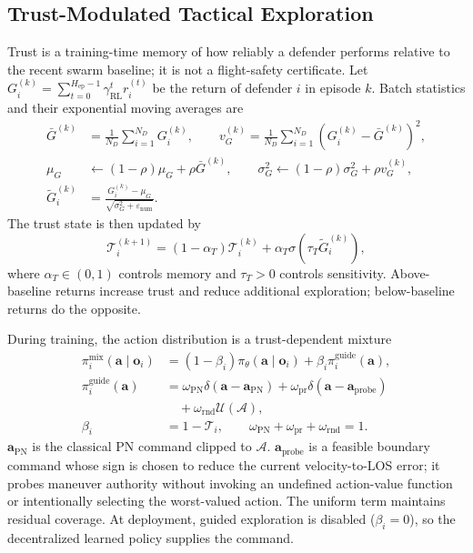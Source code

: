 \subsection{Trust-Modulated Tactical Exploration}
\label{subsec:trust_exploration}

Trust is a training-time memory of how reliably a defender performs relative to the recent
swarm baseline; it is not a flight-safety certificate. Let
$G_i^{(k)}=\sum_{t=0}^{H_{\mathrm{ep}}-1}\gamma_{\mathrm{RL}}^t r_i^{(t)}$ be the return
of defender $i$ in episode $k$. Batch statistics and their exponential moving averages are
\begin{equation}
\label{eq:trust_statistics}
\begin{aligned}
\bar G^{(k)}&=\frac{1}{N_D}\sum_{i=1}^{N_D}G_i^{(k)},\qquad
v_G^{(k)}=\frac{1}{N_D}\sum_{i=1}^{N_D}(G_i^{(k)}-\bar G^{(k)})^2,\\
\mu_G&\leftarrow(1-\rho)\mu_G+\rho\bar G^{(k)},\qquad
\sigma_G^2\leftarrow(1-\rho)\sigma_G^2+\rho v_G^{(k)},\\
\widetilde G_i^{(k)}&=\frac{G_i^{(k)}-\mu_G}
{\sqrt{\sigma_G^2+\varepsilon_{\mathrm{num}}}}.
\end{aligned}
\end{equation}
The trust state is then updated by
\begin{equation}
\label{eq:trust_update}
\mathcal T_i^{(k+1)}=(1-\alpha_T)\mathcal T_i^{(k)}
+\alpha_T\sigma(\tau_T\widetilde G_i^{(k)}),
\end{equation}
where $\alpha_T\in(0,1)$ controls memory and $\tau_T>0$ controls sensitivity. Above-baseline
returns increase trust and reduce additional exploration; below-baseline returns do the
opposite.

During training, the action distribution is a trust-dependent mixture
\begin{equation}
\label{eq:exploration_policy}
\begin{aligned}
\pi_i^{\mathrm{mix}}(\mathbf a\mid\mathbf o_i)
&=(1-\beta_i)\pi_{\theta}(\mathbf a\mid\mathbf o_i)
+\beta_i\pi_i^{\mathrm{guide}}(\mathbf a),\\
\pi_i^{\mathrm{guide}}(\mathbf a)&=
\omega_{\mathrm{PN}}\delta(\mathbf a-\mathbf a_{\mathrm{PN}})
+\omega_{\mathrm{pr}}\delta(\mathbf a-\mathbf a_{\mathrm{probe}})\\
&\quad+\omega_{\mathrm{rnd}}\mathcal U(\mathcal A),\\
\beta_i&=1-\mathcal T_i,\qquad
\omega_{\mathrm{PN}}+\omega_{\mathrm{pr}}+\omega_{\mathrm{rnd}}=1.
\end{aligned}
\end{equation}
$\mathbf a_{\mathrm{PN}}$ is the classical PN command clipped to $\mathcal A$.
$\mathbf a_{\mathrm{probe}}$ is a feasible boundary command whose sign is chosen to reduce the
current velocity-to-LOS error; it probes maneuver authority without invoking an undefined
action-value function or intentionally selecting the worst-valued action. The uniform term
maintains residual coverage. At deployment, guided exploration is disabled ($\beta_i=0$), so
the decentralized learned policy supplies the command.

